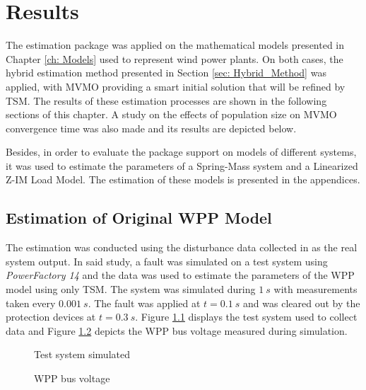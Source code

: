 \chapter{Results}
\label{ch: Results}

The estimation package was applied on the mathematical models presented in Chapter \ref{ch: Models} used to represent wind power plants. On both cases, the hybrid estimation method presented in Section \ref{sec: Hybrid_Method} was applied, with MVMO providing a smart initial solution that will be refined by TSM. The results of these estimation processes are shown in the following sections of this chapter. A study on the effects of population size on MVMO convergence time was also made and its results are depicted below.

Besides, in order to evaluate the package support on models of different systems, it was used to estimate the parameters of a Spring-Mass system and a Linearized Z-IM Load Model. The estimation of these models is presented in the appendices.

\section{Estimation of Original WPP Model}

The estimation was conducted using the disturbance data collected in \cite{Cari2015} as the real system output. In said study, a fault was simulated on a test system using \textit{PowerFactory 14} and the data was used to estimate the parameters of the WPP model using only TSM. The system was simulated during $1\ s$ with measurements taken every $0.001\ s$. The fault was applied at $t=0.1\ s$ and was cleared out by the protection devices at $t=0.3\ s$. Figure \ref{fig: test_system} displays the test system used to collect data and Figure \ref{fig: WPP_voltage} depicts the WPP bus voltage measured during simulation.

\begin{figure}[h]
	\caption{Test system simulated}
	\begin{center}
	\end{center}
	\label{fig: test_system}
\end{figure}

\begin{figure}[h]
	\caption{WPP bus voltage}
	\begin{center}
	\end{center}
	\label{fig: WPP_voltage}
\end{figure}

